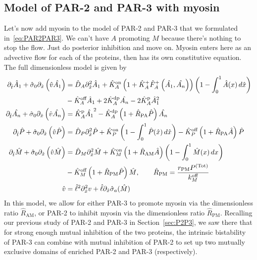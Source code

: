 \documentclass[11pt]{article}
\newcommand{\red}[1]{\color{red}#1\normalcolor}
\newcommand{\6}[1]{#1_{\text{6}}}
\newcommand{\3}[1]{#1_{\text{3}}}
\newcommand{\Tot}[1]{#1^\text{(Tot)}}
\begin{document}
\iffalse
\subsection{Model of PAR-2 and PAR-3 with myosin  \label{sec:P2P3My}}
Let's now add myosin to the model of PAR-2 and PAR-3 that we formulated in\ \eqref{eq:PAR2PAR3}. \red{We can't have $A$ promoting $M$ because there's nothing to stop the flow. Just do posterior inhibition and move on.} Myosin enters here as an advective flow for each of the proteins, then has its own constitutive equation. The full dimensionless model is given by
\begin{subequations}
\label{eq:PAR2PAR3My}
\begin{align}
\nonumber
\Dthat \hat{A}_1 +\hat{\sigma}_0  \Dxhat \left(\hat{v} \hat{\MA} \right)  &=\DhatA \Dxhat^2 \hat{A}_1 +\KhatonA\left(1+\hat{K}_A^+ \hat F_A^+\left(\hat{\MA},\hat{\PA}\right)\right)\left(1 - \int_0^1 \hat{A}(x) \, d\hat{x} \right) \\  
 &-\KhatoffA \hat{A}_1 +2\KhatdpA \hat{\PA}-2 \KhatpA \hat{A}_1^2 \\ 
\Dthat \hat{\PA} +\hat{\sigma}_0  \Dxhat \left(\hat{v} \hat{\PA} \right)  &=\KhatpA \hat{\MA}^2- \KhatdpA \left(1+\hat{R}_\text{PA}\hat{P}\right)\hat{\PA} \\ 
\Dthat \hat{P} +\hat{\sigma}_0  \Dxhat \left(\hat{v} \hat{P} \right) & =\DhatP \Dxhat^2 \hat{P}+\KhatonP \left(1 - \int_0^1 \hat{P}(\hat x) \, d\hat{x} \right)  - \KhatoffP\left(1+\hat{R}_\text{PA} \hat{A}\right)\hat{P} \\ 
\Dthat \hat{M} +\hat{\sigma}_0  \Dxhat \left(\hat{v} \hat{M} \right) &=\hat{D}_M \Dxhat^2 \hat{M} +\KhatonM \left(1+\hat R_\text{AM} \hat{A}\right)\left(1-\int_0^1  \hat{M}(x) \, dx\right)\\ \nonumber &- \KhatoffM\left(1+\hat{R}_\text{PM} \hat{P} \right) \hat{M},\qquad \hat{R}_\text{PM}=\frac{r_\text{PM}\Tot{P}}{\koff_M}\\
\hat{v} &= \hat{\ell}^2 \Dxhat^2 v +\hat{\ell} \Dxhat \hat{\sigma}_a(\hat{M})
\end{align}
\end{subequations}
In this model, we allow for either PAR-3 to promote myosin via the dimensionless ratio $\hat{R}_\text{AM}$, or PAR-2 to inhibit myosin via the dimensionless ratio $\hat{R}_\text{PM}$. Recalling our previous study of PAR-2 and PAR-3 in Section\ \ref{sec:P2P3}, we saw there that for strong enough mutual inhibition of the two proteins, the intrinsic bistability of PAR-3 can combine with mutual inhibition of PAR-2 to set up two mutually exclusive domains of enriched PAR-2 and PAR-3 (respectively). 
\end{document}
